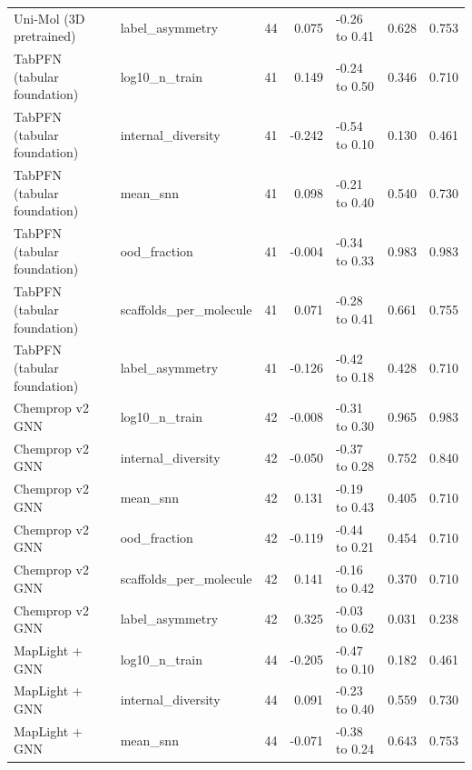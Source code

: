 \begin{landscape}
\begin{xltabular}{\linewidth}{@{}>{\raggedright\arraybackslash{}\hsize}X>{\raggedright\arraybackslash{}\hsize}Xrr>{\raggedright\arraybackslash{}\hsize}Xrr@{}}
Uni-\allowbreak{}Mol (3D pretrained) & label\_\allowbreak{}asymmetry & 44 & 0.075 & -\allowbreak{}0.26 to 0.41 & 0.628 & 0.753 \\
TabPFN (tabular foundation) & log10\_\allowbreak{}n\_\allowbreak{}train & 41 & 0.149 & -\allowbreak{}0.24 to 0.50 & 0.346 & 0.710 \\
TabPFN (tabular foundation) & internal\_\allowbreak{}diversity & 41 & -\allowbreak{}0.242 & -\allowbreak{}0.54 to 0.10 & 0.130 & 0.461 \\
TabPFN (tabular foundation) & mean\_\allowbreak{}snn & 41 & 0.098 & -\allowbreak{}0.21 to 0.40 & 0.540 & 0.730 \\
TabPFN (tabular foundation) & ood\_\allowbreak{}fraction & 41 & -\allowbreak{}0.004 & -\allowbreak{}0.34 to 0.33 & 0.983 & 0.983 \\
TabPFN (tabular foundation) & scaffolds\_\allowbreak{}per\_\allowbreak{}molecule & 41 & 0.071 & -\allowbreak{}0.28 to 0.41 & 0.661 & 0.755 \\
TabPFN (tabular foundation) & label\_\allowbreak{}asymmetry & 41 & -\allowbreak{}0.126 & -\allowbreak{}0.42 to 0.18 & 0.428 & 0.710 \\
Chemprop v2 GNN & log10\_\allowbreak{}n\_\allowbreak{}train & 42 & -\allowbreak{}0.008 & -\allowbreak{}0.31 to 0.30 & 0.965 & 0.983 \\
Chemprop v2 GNN & internal\_\allowbreak{}diversity & 42 & -\allowbreak{}0.050 & -\allowbreak{}0.37 to 0.28 & 0.752 & 0.840 \\
Chemprop v2 GNN & mean\_\allowbreak{}snn & 42 & 0.131 & -\allowbreak{}0.19 to 0.43 & 0.405 & 0.710 \\
Chemprop v2 GNN & ood\_\allowbreak{}fraction & 42 & -\allowbreak{}0.119 & -\allowbreak{}0.44 to 0.21 & 0.454 & 0.710 \\
Chemprop v2 GNN & scaffolds\_\allowbreak{}per\_\allowbreak{}molecule & 42 & 0.141 & -\allowbreak{}0.16 to 0.42 & 0.370 & 0.710 \\
Chemprop v2 GNN & label\_\allowbreak{}asymmetry & 42 & 0.325 & -\allowbreak{}0.03 to 0.62 & 0.031 & 0.238 \\
Map\allowbreak{}Light + GNN & log10\_\allowbreak{}n\_\allowbreak{}train & 44 & -\allowbreak{}0.205 & -\allowbreak{}0.47 to 0.10 & 0.182 & 0.461 \\
Map\allowbreak{}Light + GNN & internal\_\allowbreak{}diversity & 44 & 0.091 & -\allowbreak{}0.23 to 0.40 & 0.559 & 0.730 \\
Map\allowbreak{}Light + GNN & mean\_\allowbreak{}snn & 44 & -\allowbreak{}0.071 & -\allowbreak{}0.38 to 0.24 & 0.643 & 0.753 \\

\end{xltabular}
\end{landscape}
